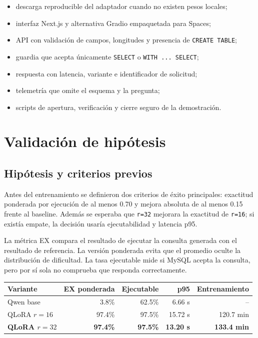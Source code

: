\documentclass[11pt,letterpaper]{article}
\newcommand{\code}[1]{\texttt{#1}}
\begin{document}
\begin{itemize}
  \item descarga reproducible del adaptador cuando no existen pesos locales;
  \item interfaz Next.js y alternativa Gradio empaquetada para Spaces;
  \item API con validación de campos, longitudes y presencia de \code{CREATE TABLE};
  \item guardia que acepta únicamente \code{SELECT} o \code{WITH ... SELECT};
  \item respuesta con latencia, variante e identificador de solicitud;
  \item telemetría que omite el esquema y la pregunta;
  \item scripts de apertura, verificación y cierre seguro de la demostración.
\end{itemize}

\section{Validación de hipótesis}

\subsection{Hipótesis y criterios previos}

Antes del entrenamiento se definieron dos criterios de éxito principales: exactitud ponderada por
ejecución de al menos 0.70 y mejora absoluta de al menos 0.15 frente al baseline. Además se esperaba
que \code{r=32} mejorara la exactitud de \code{r=16}; si existía empate, la decisión usaría
ejecutabilidad y latencia p95.

La métrica EX compara el resultado de ejecutar la consulta generada con el resultado de referencia.
La versión ponderada evita que el promedio oculte la distribución de dificultad. La tasa ejecutable
mide si MySQL acepta la consulta, pero por sí sola no comprueba que responda correctamente.

\begin{center}
\begin{tabular}{@{}lrrrr@{}}
\toprule
\textbf{Variante} & \textbf{EX ponderada} & \textbf{Ejecutable} & \textbf{p95} & \textbf{Entrenamiento}\\
\midrule
Qwen base & 3.8\% & 62.5\% & 6.66 s & --\\
QLoRA $r=16$ & 97.4\% & 97.5\% & 15.72 s & 120.7 min\\
\textbf{QLoRA $r=32$} & \textbf{97.4\%} & \textbf{97.5\%} & \textbf{13.20 s} & \textbf{133.4 min}\\
\bottomrule
\end{tabular}
\end{center}
\end{document}
